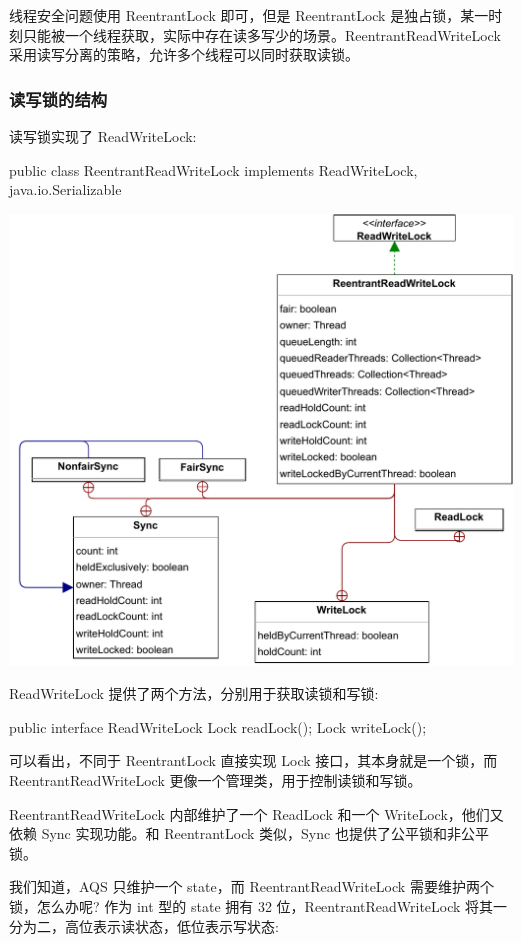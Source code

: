 线程安全问题使用 ReentrantLock 即可，但是 ReentrantLock 是独占锁，某一时刻只能被一个线程获取，实际中存在读多写少的场景。ReentrantReadWriteLock 采用读写分离的策略，允许多个线程可以同时获取读锁。

\subsubsection*{读写锁的结构}

读写锁实现了 ReadWriteLock:

\begin{Java}
public class ReentrantReadWriteLock implements ReadWriteLock, java.io.Serializable
\end{Java}

\begin{center}
    \includegraphics[width=0.7\linewidth]{../../Images/ReentrantReadWriteLock.pdf}
\end{center}

ReadWriteLock 提供了两个方法，分别用于获取读锁和写锁:

\begin{Java}
public interface ReadWriteLock {
    Lock readLock();
    Lock writeLock();
}
\end{Java}

可以看出，不同于 ReentrantLock 直接实现 Lock 接口，其本身就是一个锁，而 ReentrantReadWriteLock 更像一个管理类，用于控制读锁和写锁。

ReentrantReadWriteLock 内部维护了一个 ReadLock 和一个 WriteLock，他们又依赖 Sync 实现功能。和 ReentrantLock 类似，Sync 也提供了公平锁和非公平锁。

我们知道，AQS 只维护一个 state，而 ReentrantReadWriteLock 需要维护两个锁，怎么办呢? 作为 int 型的 state 拥有 32 位，ReentrantReadWriteLock 将其一分为二，高位表示读状态，低位表示写状态:


